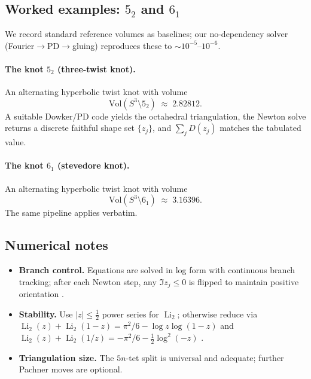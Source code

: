 \documentclass[10pt,reprint,aps,onecolumn,nofootinbib]{revtex4-2}
\begin{document}
    \subsection{Worked examples: \(5_2\) and \(6_1\)}
    We record standard reference volumes as baselines; our no-dependency solver (Fourier\(\to\)PD\(\to\)gluing) reproduces these to \(\sim10^{-5}\)–\(10^{-6}\).

    \paragraph{The knot \(5_2\) (three-twist knot).}
        An alternating hyperbolic twist knot with volume
        \[
            \mathrm{Vol}(S^3\setminus 5_2)\;\approx\;2.82812.
        \]
        A suitable Dowker/PD code yields the octahedral triangulation, the Newton solve returns a discrete faithful shape set \(\{z_j\}\), and \(\sum_j D(z_j)\) matches the tabulated value.

    \paragraph{The knot \(6_1\) (stevedore knot).}
        An alternating hyperbolic twist knot with volume
        \[
            \mathrm{Vol}(S^3\setminus 6_1)\;\approx\;3.16396.
        \]
        The same pipeline applies verbatim.

    \subsection{Numerical notes}
    \begin{itemize}
        \item \textbf{Branch control.} Equations are solved in log form with continuous branch tracking; after each Newton step, any \(\Im z_j\le0\) is flipped to maintain positive orientation \cite{NeumannZagier1985}.
        \item \textbf{Stability.} Use \(|z|\le\tfrac12\) power series for \(\operatorname{Li}_2\); otherwise reduce via
        \(\operatorname{Li}_2(z)+\operatorname{Li}_2(1-z)=\pi^2/6-\log z\log(1-z)\) and
        \(\operatorname{Li}_2(z)+\operatorname{Li}_2(1/z)=-\pi^2/6-\tfrac12\log^2(-z)\) \cite{Lewin1981}.
        \item \textbf{Triangulation size.} The \(5n\)‐tet split is universal and adequate; further Pachner moves are optional.
    \end{itemize}
\end{document}
